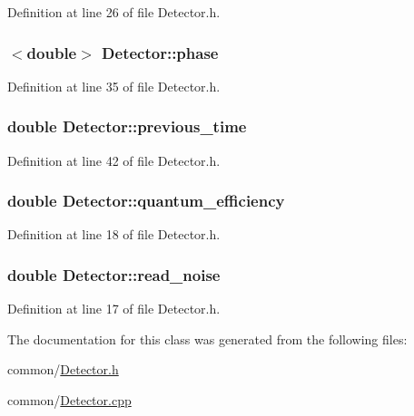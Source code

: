 Definition at line 26 of file Detector.h.

\hypertarget{classDetector_a434d34a6f28382fff13111fbb8c1b6a9}{
\subsubsection[{phase}]{$<$double$>$ {\bf Detector::phase}}}
\label{classDetector_a434d34a6f28382fff13111fbb8c1b6a9}


Definition at line 35 of file Detector.h.

\hypertarget{classDetector_a2cb4ca9c009f4465404af3bd4d943788}{
\subsubsection[{previous\_\-time}]{\setlength{\rightskip}{0pt plus 5cm}double {\bf Detector::previous\_\-time}}}
\label{classDetector_a2cb4ca9c009f4465404af3bd4d943788}


Definition at line 42 of file Detector.h.

\hypertarget{classDetector_a4a830152b9beb393e26f8f2e26fda464}{
\subsubsection[{quantum\_\-efficiency}]{\setlength{\rightskip}{0pt plus 5cm}double {\bf Detector::quantum\_\-efficiency}}}
\label{classDetector_a4a830152b9beb393e26f8f2e26fda464}


Definition at line 18 of file Detector.h.

\hypertarget{classDetector_a8eca17062f19ec98b728af67752abf6f}{
\subsubsection[{read\_\-noise}]{\setlength{\rightskip}{0pt plus 5cm}double {\bf Detector::read\_\-noise}}}
\label{classDetector_a8eca17062f19ec98b728af67752abf6f}


Definition at line 17 of file Detector.h.



The documentation for this class was generated from the following files:\begin{DoxyCompactItemize}
\item 
common/\hyperlink{Detector_8h}{Detector.h}\item 
common/\hyperlink{Detector_8cpp}{Detector.cpp}\end{DoxyCompactItemize}
